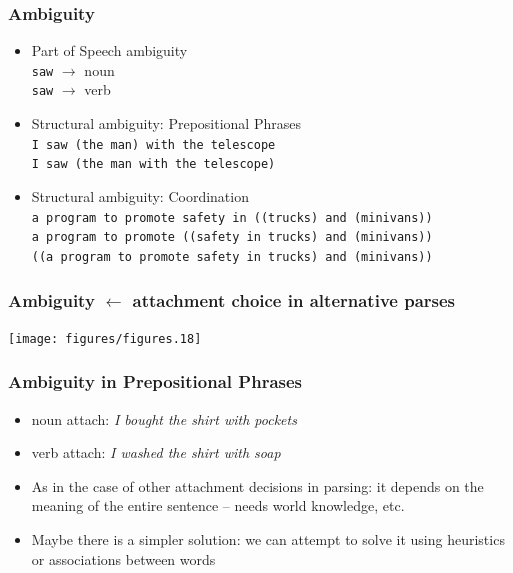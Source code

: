 \begin{frame}
\frametitle{Ambiguity}
\begin{itemize}
  \item Part of Speech ambiguity\\
        {\tt saw} $\rightarrow$ {\color{red}noun}\\
        {\tt saw} $\rightarrow$ {\color{red}verb}
  \item Structural ambiguity: Prepositional Phrases\\
        {\tt I saw (the man) with the telescope}\\
        {\tt I saw (the man with the telescope)}
  \item Structural ambiguity: Coordination\\
        {\tt a program to promote safety in ((trucks) and (minivans))}\\
        {\tt a program to promote ((safety in trucks) and (minivans))}\\
        {\tt ((a program to promote safety in trucks) and (minivans))}
\end{itemize}

\end{frame}

\begin{frame}[fragile]
\frametitle{Ambiguity $\leftarrow$ attachment choice in alternative parses}
\texttt{[image: figures/figures.18]}
\end{frame}

\begin{frame}
\frametitle{Ambiguity in Prepositional Phrases}
\begin{itemize}
\item<1-> noun attach: {\em I bought the shirt with pockets}
\item<2-> verb attach: {\em I washed the shirt with soap}
\item<3-> As in the case of other attachment decisions in parsing: it depends on the meaning of the entire sentence -- needs world knowledge, etc.
\item<4-> Maybe there is a simpler solution: we can attempt to solve it using heuristics or associations between words
\end{itemize}

\end{frame}

